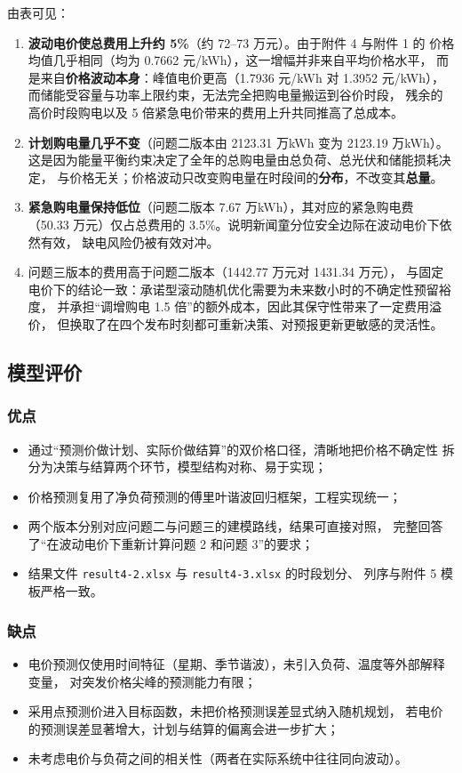 \documentclass[12pt,a4paper]{article}
\begin{document}
由表可见：

\begin{enumerate}
    \item \textbf{波动电价使总费用上升约 5\%}（约 72--73 万元）。由于附件 4 与附件 1 的
          价格均值几乎相同（均为 0.7662 元/kWh），这一增幅并非来自平均价格水平，
          而是来自\textbf{价格波动本身}：峰值电价更高（1.7936 元/kWh 对 1.3952 元/kWh），
          而储能受容量与功率上限约束，无法完全把购电量搬运到谷价时段，
          残余的高价时段购电以及 5 倍紧急电价带来的费用上升共同推高了总成本。
    \item \textbf{计划购电量几乎不变}（问题二版本由 2123.31 万kWh 变为 2123.19 万kWh）。
          这是因为能量平衡约束决定了全年的总购电量由总负荷、总光伏和储能损耗决定，
          与价格无关；价格波动只改变购电量在时段间的\textbf{分布}，不改变其\textbf{总量}。
    \item \textbf{紧急购电量保持低位}（问题二版本 7.67 万kWh），其对应的紧急购电费
          （50.33 万元）仅占总费用的 3.5\%。说明新闻童分位安全边际在波动电价下依然有效，
          缺电风险仍被有效对冲。
    \item 问题三版本的费用高于问题二版本（1442.77 万元对 1431.34 万元），
          与固定电价下的结论一致：承诺型滚动随机优化需要为未来数小时的不确定性预留裕度，
          并承担“调增购电 1.5 倍”的额外成本，因此其保守性带来了一定费用溢价，
          但换取了在四个发布时刻都可重新决策、对预报更新更敏感的灵活性。
\end{enumerate}

\subsection{模型评价}

\subsubsection{优点}

\begin{itemize}
    \item 通过“预测价做计划、实际价做结算”的双价格口径，清晰地把价格不确定性
          拆分为决策与结算两个环节，模型结构对称、易于实现；
    \item 价格预测复用了净负荷预测的傅里叶谐波回归框架，工程实现统一；
    \item 两个版本分别对应问题二与问题三的建模路线，结果可直接对照，
          完整回答了“在波动电价下重新计算问题 2 和问题 3”的要求；
    \item 结果文件 \texttt{result4-2.xlsx} 与 \texttt{result4-3.xlsx} 的时段划分、
          列序与附件 5 模板严格一致。
\end{itemize}

\subsubsection{缺点}

\begin{itemize}
    \item 电价预测仅使用时间特征（星期、季节谐波），未引入负荷、温度等外部解释变量，
          对突发价格尖峰的预测能力有限；
    \item 采用点预测价进入目标函数，未把价格预测误差显式纳入随机规划，
          若电价的预测误差显著增大，计划与结算的偏离会进一步扩大；
    \item 未考虑电价与负荷之间的相关性（两者在实际系统中往往同向波动）。
\end{itemize}
\end{document}
